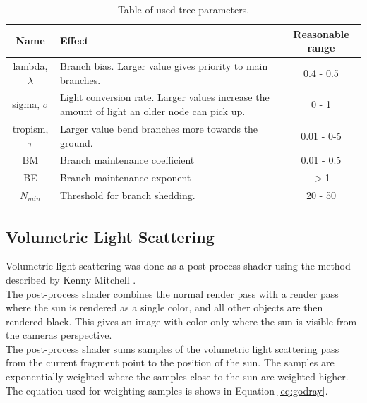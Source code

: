 \documentclass{article}
\begin{document}
	  		\begin{table} [!h]
	  			\begin{center}
	  				\caption{Table of used tree parameters.}
	  				\begin{tabular}{ | c | m{6.5cm} | c | } 
	  					\hline
	  					Name & Effect & Reasonable range \\
	  					\hline
	  					\hline
	  					lambda, $\lambda$ & Branch bias. Larger value gives priority to main branches. & 0.4 - 0.5 \\ 
	  					\hline
	  					sigma, $\sigma$ & Light conversion rate. Larger values increase the amount of light an older node can pick up. & 0 - 1\\ 
	  					\hline
	  					tropism, $\tau$ & Larger value bend branches more towards the ground. & 0.01 - 0-5 \\ 
	  					\hline
	  					BM & Branch maintenance coefficient & 0.01 - 0.5 \\ 
	  					\hline
	  					BE & Branch maintenance exponent &  $>$1\\ 
	  					\hline
	  					$N_{min}$ & Threshold for branch shedding. & 20 - 50 \\ 
	  					\hline
	  				\end{tabular}
	  				
	  				\label{table:param}
	  			\end{center}
	  		\end{table}
  			
  		\subsection{Volumetric Light Scattering}
  		
  			Volumetric light scattering was done as a post-process shader using the method described by Kenny Mitchell \citep{mitchell}. \\
  			
  			The post-process shader combines the normal render pass with a render pass where the sun is rendered as a single color, and all other objects are then rendered black. This gives an image with color only where the sun is visible from the cameras perspective. \\
  			
  			The post-process shader sums samples of the volumetric light scattering pass from the current fragment point to the position of the sun. The samples are exponentially weighted where the samples close to the sun are weighted higher. The equation used for weighting samples is shows in Equation \ref{eq:godray}. 
  			
\end{document}
